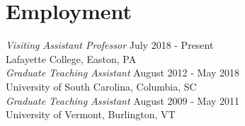 \documentclass{article}
\begin{document}
  \section*{Employment}

  \textsl{Visiting Assistant Professor} \hfill July 2018 - Present\\
  Lafayette College, Easton, PA\\
  
  \noindent \textsl{Graduate Teaching Assistant} \hfill August 2012 - May 2018 \\
  University of South Carolina, Columbia, SC\\
  
  \noindent\textsl{Graduate Teaching Assistant} \hfill August 2009 - May 2011 \\
  University of Vermont, Burlington, VT\\

\end{document}
